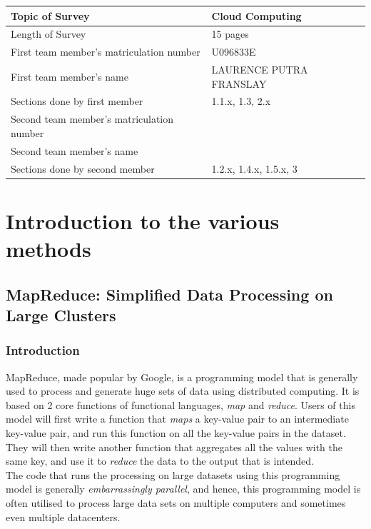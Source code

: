 \documentclass[]{article}
\begin{document}
\begin{table}[here]
\centering
\begin{tabularx}{\textwidth}{| X | X | }
\hline
Topic of Survey								& 	Cloud Computing\\
\hline
Length of Survey							& 	15 pages\\
\hline
First team member's matriculation number	&	U096833E\\
\hline
First team member's name					&	LAURENCE PUTRA FRANSLAY\\
\hline
Sections done by first member				& 	1.1.x, 1.3, 2.x\\
\hline
Second team member's matriculation number	&	\\
\hline
Second team member's name					&	\\
\hline
Sections done by second member				& 	1.2.x, 1.4.x, 1.5.x, 3\\
\hline

\hline
\end{tabularx}
\end{table}

\pagebreak

\section{Introduction to the various methods}
\subsection{MapReduce: Simplified Data Processing on Large Clusters}
\subsubsection{Introduction}
MapReduce, made popular by Google, is a programming model that is generally used to process and generate huge sets of data using distributed computing. It is based on 2 core functions of functional languages, \emph{map} and \emph{reduce}. Users of this model will first write a function that \emph{maps} a key-value pair to an intermediate key-value pair, and run this function on all the key-value pairs in the dataset. They will then write another function that aggregates all the values with the same key, and use it to \emph{reduce} the data to the output that is intended. \\

The code that runs the processing on large datasets using this programming model is generally \emph{embarrassingly parallel}\footnotemark{}, and hence, this programming model is often utilised to process large data sets on multiple computers and sometimes even multiple datacenters. \\
\end{document}
